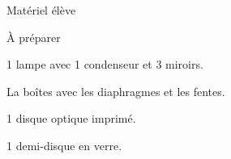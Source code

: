 
\begin{boiteMateriel}{Matériel élève}
  \effectifSeconde
\end{boiteMateriel}


\begin{boiteMateriel}{À préparer}
  \begin{protocole}
    \item 1 lampe avec 1 condenseur et 3 miroirs.
    \item La boîtes avec les diaphragmes et les fentes.
    \item 1 disque optique imprimé.
    \item 1 demi-disque en verre.
  \end{protocole}
\end{boiteMateriel}